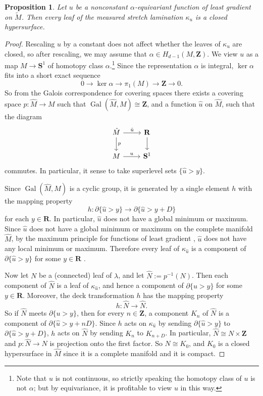 \documentclass[reqno,11pt]{amsart}
\newcommand{\ZZ}{\mathbf{Z}}
\newcommand{\RR}{\mathbf{R}}
\newcommand{\Sph}{\mathbf S}
\DeclareMathOperator{\Gal}{Gal}
\newtheorem{proposition}[theorem]{Proposition}
\theoremstyle{definition}
\numberwithin{equation}{section}
\begin{document}
\begin{proposition}
Let $u$ be a nonconstant $\alpha$-equivariant function of least gradient on $\tilde M$.
Then every leaf of the measured stretch lamination $\kappa_u$ is a closed hypersurface.
\end{proposition}
\begin{proof}
Rescaling $u$ by a constant does not affect whether the leaves of $\kappa_u$ are closed, so after rescaling, we may assume that $\alpha \in H_{d - 1}(M, \ZZ)$.
We view $u$ as a map $M \to \Sph^1$ of homotopy class $\alpha$.\footnote{Note that $u$ is not continuous, so strictly speaking the homotopy class of $u$ is not $\alpha$; but by equivariance, it is profitable to view $u$ in this way.}
Since the representation $\alpha$ is integral, $\ker \alpha$ fits into a short exact sequence 
$$0 \to \ker \alpha \to \pi_1(M) \to \ZZ \to 0.$$
So from the Galois correspondence for covering spaces there exists a covering space $p: \hat M \to M$ such that $\Gal(\hat M, M) \cong \ZZ$, and a function $\hat u$ on $\hat M$, such that the diagram 
$$\begin{tikzcd}
\hat M \arrow[r, "\hat u"] \arrow[d, "p"] & \RR \arrow[d] \\
M \arrow[r, "u"] & \Sph^1
\end{tikzcd}$$
commutes.
In particular, it sense to take superlevel sets $\{\hat u > y\}$.

Since $\Gal(\hat M, M)$ is a cyclic group, it is generated by a single element $h$ with the mapping property
$$h: \partial \{\hat u > y\} \to \partial \{\hat u > y + D\}$$
for each $y \in \RR$.
In particular, $\hat u$ does not have a global minimum or maximum.
Since $\hat u$ does not have a global minimum or maximum on the complete manifold $\hat M$, by the maximum principle for functions of least gradient \cite[Theorem 5.1]{HakkarainenKorteLahtiShanmugalingam+2015}, $\hat u$ does not have any local minimum or maximum.
Therefore every leaf of $\kappa_{\hat u}$ is a component of $\partial \{\hat u > y\}$ for some $y \in \RR$ \cite[Proposition 4.7]{BackusCML}.

Now let $N$ be a (connected) leaf of $\lambda$, and let $\hat N := p^{-1}(N)$.
Then each component of $\hat N$ is a leaf of $\kappa_{\hat u}$, and hence a component of $\partial \{u > y\}$ for some $y \in \RR$.
Moreover, the deck transformation $h$ has the mapping property
$$h: \hat N \to \hat N.$$
So if $\hat N$ meets $\partial \{u > y\}$, then for every $n \in \ZZ$, a component $K_n$ of $\hat N$ is a component of $\partial \{\hat u > y + nD\}$.
Since $h$ acts on $\kappa_{\hat u}$ by sending $\partial \{\hat u > y\}$ to $\partial \{\hat u > y + D\}$, $h$ acts on $\hat N$ by sending $K_n$ to $K_{n + D}$.
In particular, $\hat N \cong N \times \ZZ$ and $p: \hat N \to N$ is projection onto the first factor. 
So $N \cong K_0$, and $K_0$ is a closed hypersurface in $\hat M$ since it is a complete manifold \cite[Theorem 3.3]{BackusCML} and it is compact.
\end{proof}
\end{document}
